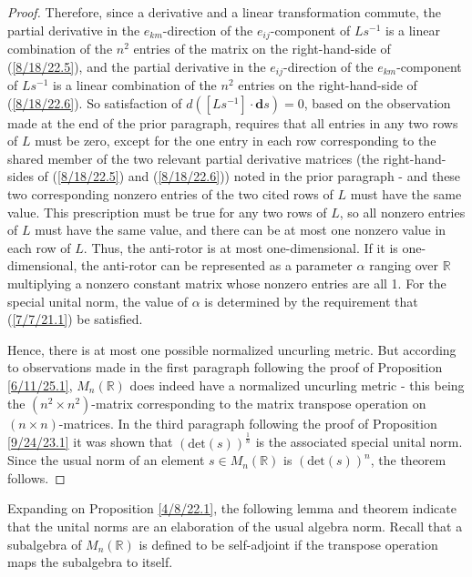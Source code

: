 \documentclass{amsart}
\theoremstyle{definition}
\numberwithin{theorem}{section}
\numberwithin{equation}{section}
\begin{document}
\begin{proof}
Therefore, since a derivative and a linear transformation commute, the partial derivative in the $e_{km}$-direction of the $e_{ij}$-component of $Ls^{-1}$ is a linear combination of the $n^2$ entries of the matrix on the right-hand-side of (\ref{8/18/22.5}), and  the partial derivative in the $e_{ij}$-direction of the $e_{km}$-component of $Ls^{-1}$ is a linear combination of the $n^2$ entries on the right-hand-side of (\ref{8/18/22.6}).
So satisfaction of \mbox{$d\left([Ls^{-1}]\cdot \mathbf{d}s\right) = 0$,} based on the observation made at the end of the prior paragraph, requires that all entries in any two rows of $L$ must be zero, except for the one entry in each row corresponding to the shared member of the two relevant partial derivative matrices (the right-hand-sides of (\ref{8/18/22.5}) and (\ref{8/18/22.6})) noted in the prior paragraph - and these two corresponding nonzero entries of the two cited rows of $L$ must have the same value.  This prescription must be true for any two rows of $L$, so all nonzero entries of $L$ must have the same value, and there can be at most one nonzero value in each row of $L$.  Thus, the anti-rotor is at most one-dimensional. If it is one-dimensional, the anti-rotor can be represented as a parameter $\alpha$ ranging over $\mathbb{R}$ multiplying a nonzero constant matrix whose nonzero entries are all 1.  
For the special unital norm, the value of $\alpha$ is determined by the requirement that (\ref{7/7/21.1}) be satisfied. 


Hence, there is at most one possible normalized uncurling metric.  But according to observations made in the first paragraph following the proof of Proposition \ref{6/11/25.1}, $ M_n(\mathbb{R})$ does indeed have a normalized uncurling metric - this being the $(n^2\times n^2)$-matrix corresponding to the matrix transpose operation on $(n\times n)$-matrices.  In the third paragraph following the proof of Proposition \ref{9/24/23.1} it was shown that $(\mbox{det}(s))^{\frac{1}{n}}$ is the associated special unital norm.  Since the usual norm of an element $s\in M_n(\mathbb{R})$ is $(\mbox{det}(s))^n$, the theorem follows.
 \end{proof}
 
 Expanding on Proposition \ref{4/8/22.1}, the following lemma and theorem indicate that the unital norms are an elaboration of the usual algebra norm.  Recall that a subalgebra of $M_n(\mathbb{R})$ is defined to be self-adjoint if the transpose operation maps the subalgebra to itself.
 
\end{document}
